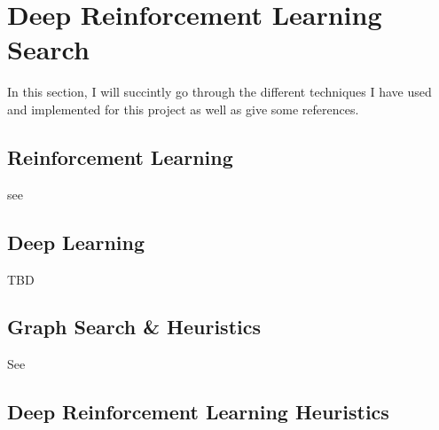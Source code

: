 
\chapter{Deep Reinforcement Learning Search} %

\label{Chapter1} %

In this section, I will succintly go through the different techniques I have used and implemented for this project as well as give some references.



\section{Reinforcement Learning}

see \cite{Sutton1998}


\section{Deep Learning}

TBD


\section{Graph Search \& Heuristics}

\label{GSH}

See \cite{DBLP:journals/jacm/DechterP85}



\section{Deep Reinforcement Learning Heuristics}

